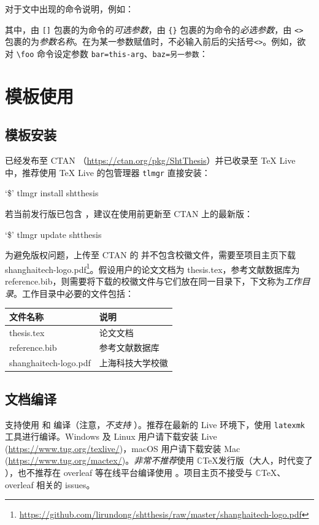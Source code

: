 \documentclass[bachelor, comfort]{shtthesis}
\newcommand\prompt{\textup{\$}}
\providecommand{\emoji}[1]{ \fbox{\emph{#1}} }
\begin{document}
对于文中出现的命令说明，例如：
\begin{latex}
\end{latex}
其中，由 \verb|[]| 包裹的为命令的\emph{可选参数}，由 \verb|{}| 包裹的为命令的\emph{必选参数}，由 \verb|<>| 包裹的为\emph{参数名称}。在为某一参数赋值时，不必输入前后的尖括号\verb|<>|。例如，欲对 \verb|\foo| 命令设定参数 \verb|bar=this-arg|、\verb|baz=另一参数|：
\begin{latex}
\end{latex}

\chapter{模板使用}
\section{模板安装}
\shtthesis{} 已经发布至 CTAN （\url{https://ctan.org/pkg/ShtThesis}）并已收录至 \TeX{} Live 中，推荐使用 \TeX{} Live 的包管理器 \verb|tlmgr| 直接安装：
\begin{shell}
`\prompt' tlmgr install shtthesis
\end{shell}
若当前发行版已包含 \shtthesis{}，建议在使用前更新至 CTAN 上的最新版：
\begin{shell}
`\prompt' tlmgr update shtthesis
\end{shell}

为避免版权问题，上传至 CTAN 的 \shtthesis{} 并不包含校徽文件，需要至项目主页下载 shanghaitech-logo.pdf\footnote{\url{https://github.com/lirundong/shtthesis/raw/master/shanghaitech-logo.pdf}}。假设用户的论文文档为 thesis.tex，参考文献数据库为 reference.bib，则需要将下载的校徽文件与它们放在同一目录下，下文称为\emph{工作目录}。工作目录中必要的文件包括：
\begin{center}
  \begin{tabular}{ll}
    \toprule
    文件名称 & 说明 \\
    \midrule 
    thesis.tex & 论文文档 \\
    reference.bib & 参考文献数据库 \\
    shanghaitech-logo.pdf & 上海科技大学校徽 \\
    \bottomrule
  \end{tabular}
\end{center}

\section{文档编译}
\shtthesis{} 支持使用  和  编译（注意，\emph{不支持} ）。推荐在最新的  Live 环境下，使用 \verb|latexmk| 工具进行编译。Windows 及 Linux 用户请下载安装  Live (\url{https://www.tug.org/texlive/})，macOS 用户请下载安装 Mac (\url{https://www.tug.org/mactex/})。\emph{非常不推荐}使用 $\mathbb{C}$\TeX 发行版（大人，时代变了\emoji{unamused}），也不推荐在 overleaf 等在线平台编译使用 \shtthesis{}。项目主页不接受与 $\mathbb{C}$\TeX、overleaf 相关的 issues。
\end{document}
